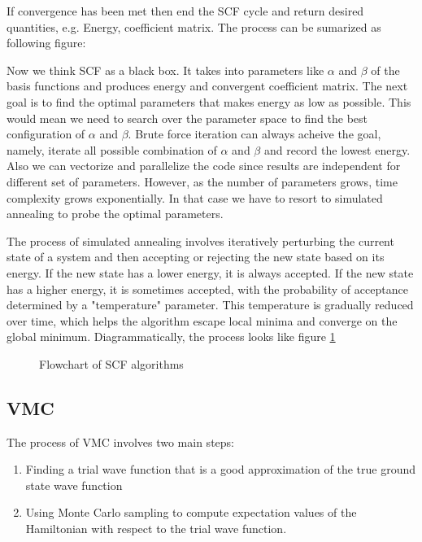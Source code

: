 \documentclass[11pt]{article}
\begin{document}
If convergence has been met then end the SCF cycle and return desired quantities, e.g. Energy, coefficient matrix. The process can be sumarized as following figure:


Now we think SCF as a black box. It takes into parameters like $\alpha$ and $\beta$ of the basis functions and produces energy and convergent coefficient matrix. The next goal is to find the optimal parameters that makes energy as low as possible. This would mean we need to search over the parameter space to find the best configuration of $\alpha$ and $\beta$. Brute force iteration can always acheive the goal, namely, iterate all possible combination of $\alpha$ and $\beta$ and record the lowest energy. Also we can vectorize and parallelize the code since results are independent for different set of parameters. However, as the number of parameters grows, time complexity grows exponentially. In that case we have to resort to simulated annealing to probe the optimal parameters. \cite{simulated-annealing}

The process of simulated annealing involves iteratively perturbing the current state of a system and then accepting or rejecting the new state based on its energy. If the new state has a lower energy, it is always accepted. If the new state has a higher energy, it is sometimes accepted, with the probability of acceptance determined by a "temperature" parameter. This temperature is gradually reduced over time, which helps the algorithm escape local minima and converge on the global minimum. Diagrammatically, the process looks like figure \ref{fig:scf flowchart}

\begin{figure}
    \centering
    \qquad
    \caption{Flowchart of SCF algorithms}%
    \label{fig:scf flowchart}%
\end{figure}

\subsection{VMC}
The process of VMC involves two main steps: 
\begin{enumerate}
    \item Finding a trial wave function that is a good approximation of the true ground state wave function
    \item Using Monte Carlo sampling to compute expectation values of the Hamiltonian with respect to the trial wave function.
\end{enumerate}
\end{document}
